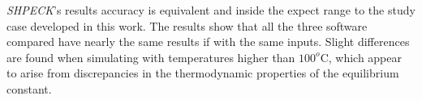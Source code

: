 \emph{SHPECK}'s results accuracy is equivalent and inside the expect range to the study case developed in this work. The results show that all the three software compared have nearly the same results if with the same inputs. Slight differences are found when simulating with temperatures higher than $100^o$C, which appear to arise from discrepancies in the thermodynamic properties of the equilibrium constant.




